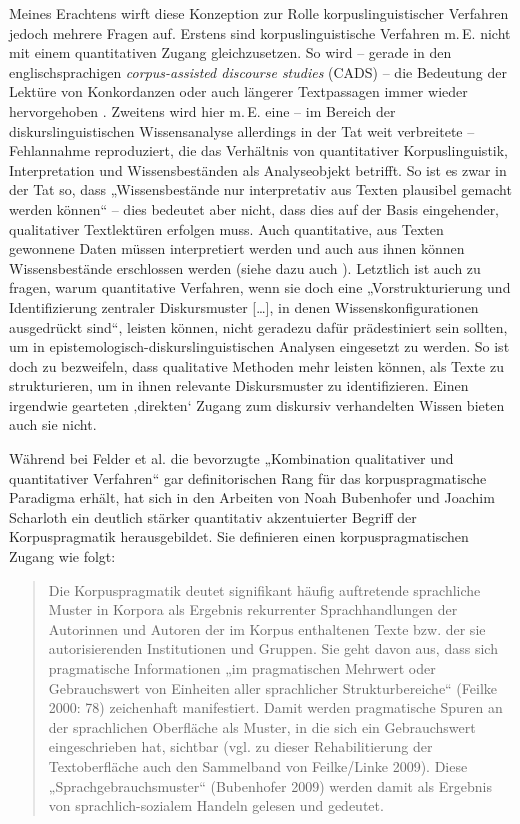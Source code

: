 Meines Erachtens wirft diese Konzeption zur Rolle korpuslinguistischer Verfahren jedoch mehrere Fragen auf. Erstens sind korpuslinguistische Verfahren m.\,E. nicht mit einem quantitativen Zugang gleichzusetzen. So wird -- gerade in den englischsprachigen \emph{corpus-assisted discourse studies} (CADS) -- die Bedeutung der Lektüre von Konkordanzen oder auch längerer Textpassagen immer wieder hervorgehoben \autocite[siehe etwa][7]{gillingsTakingRoadLess2024}. Zweitens wird hier m.\,E. eine -- im Bereich der diskurslinguistischen Wissensanalyse allerdings in der Tat weit verbreitete -- Fehlannahme reproduziert, die das Verhältnis von quantitativer Korpuslinguistik, Interpretation und Wissensbeständen als Analyseobjekt betrifft. So ist es zwar in der Tat so, dass „Wissensbestände nur interpretativ aus Texten plausibel gemacht werden können`` -- dies bedeutet aber nicht, dass dies auf der Basis eingehender, qualitativer Textlektüren erfolgen muss. Auch quantitative, aus Texten gewonnene Daten müssen interpretiert werden und auch aus ihnen können Wissensbestände erschlossen werden (siehe dazu auch ). Letztlich ist auch zu fragen, warum quantitative Verfahren, wenn sie doch eine „Vorstrukturierung und Identifizierung zentraler Diskursmuster {[}\ldots{]}, in denen Wissenskonfigurationen ausgedrückt sind``, leisten können, nicht geradezu dafür prädestiniert sein sollten, um in epistemologisch-diskurslinguistischen Analysen eingesetzt zu werden. So ist doch zu bezweifeln, dass qualitative Methoden mehr leisten können, als Texte zu strukturieren, um in ihnen relevante Diskursmuster zu identifizieren. Einen irgendwie gearteten ‚direkten` Zugang zum diskursiv verhandelten Wissen bieten auch sie nicht.

Während bei Felder et al. \autocite*[4-5]{felderKorpuspragmatikParadigmaZwischen2012} die bevorzugte „Kombination qualitativer und quantitativer Verfahren`` gar definitorischen Rang für das korpuspragmatische Paradigma erhält, hat sich in den Arbeiten von Noah Bubenhofer und Joachim Scharloth ein deutlich stärker quantitativ akzentuierter Begriff der Korpuspragmatik herausgebildet. Sie definieren einen korpuspragmatischen Zugang wie folgt:

\begin{quote}
Die Korpuspragmatik deutet signifikant häufig auftretende sprachliche Muster in Korpora als Ergebnis rekurrenter Sprachhandlungen der Autorinnen und Autoren der im Korpus enthaltenen Texte bzw. der sie autorisierenden Institutionen und Gruppen. Sie geht davon aus, dass sich pragmatische Informationen „im pragmatischen Mehrwert oder Gebrauchswert von Einheiten aller sprachlicher Strukturbereiche`` (Feilke 2000: 78) zeichenhaft manifestiert. Damit werden pragmatische Spuren an der sprachlichen Oberfläche als Muster, in die sich ein Gebrauchswert eingeschrieben hat, sichtbar (vgl. zu dieser Rehabilitierung der Textoberfläche auch den Sammelband von Feilke{\slash}Linke 2009). Diese „Sprachgebrauchsmuster`` (Bubenhofer 2009) werden damit als Ergebnis von sprachlich-sozialem Handeln gelesen und gedeutet. \autocite[148-149]{bubenhoferKorpuslinguistischeDiskursanalyseNutzen2013}
\end{quote}


